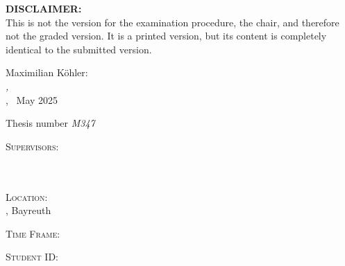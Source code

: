 
\begingroup
\thispagestyle{empty}

\hfill
\vspace{2cm}

\begin{minipage}[l]{.7\textwidth}
    \textbf{DISCLAIMER:}\\
    This is not the version for the examination procedure, the chair, and therefore not the graded version. It is a printed version, but its content is completely identical to the submitted version.
\end{minipage}

\vfill

Maximilian Köhler:\\
\textit{\titel,} \\
\arbeit, \textcopyright~May 2025
\medskip

Thesis number {\itshape M347}
\bigskip

\textsc{Supervisors}: \\
\betreuer \\
\betreuerzwei \\ 
\gutachter
\medskip

\textsc{Location}: \\
\abgabeort, Bayreuth
\medskip

\textsc{Time Frame}: \\
\zeitraum
\medskip

\textsc{Student ID}: \\
\matrikelnr

\endgroup


